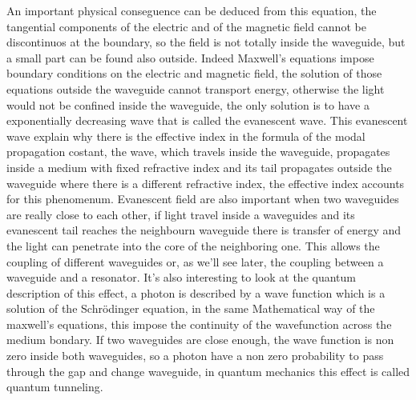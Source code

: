 An important physical conseguence can be deduced from this equation, the tangential components of the electric and of the magnetic field cannot be discontinuos at the boundary, so the field is not totally inside the waveguide, but a small part can be found also outside. Indeed Maxwell's equations impose boundary conditions on the electric and magnetic field, the solution of those equations outside the waveguide cannot transport energy, otherwise the light would not be confined inside the waveguide, the only solution is to have a exponentially decreasing wave that is called the evanescent wave. This evanescent wave explain why there is the effective index in the formula of the modal propagation costant, the wave, which travels inside the waveguide, propagates inside a medium with fixed refractive index and its tail propagates outside the waveguide where there is a different refractive index, the effective index accounts for this phenomenum.
Evanescent field are also important when two waveguides are really close to each other, if light travel inside a waveguides and its evanescent tail reaches the neighbourn waveguide there is transfer of energy and the light can penetrate into the core of the neighboring one. This allows the coupling of different waveguides or, as we'll see later, the coupling between a waveguide and a resonator. It's also interesting to look at the quantum description of this effect, a photon is described by a wave function which is a solution of the Schr{\"o}dinger equation, in the same Mathematical way of the maxwell's equations, this impose the continuity of the wavefunction across the medium bondary. If two waveguides are close enough, the wave function is non zero inside both waveguides, so a photon have a non zero probability to pass through the gap and change waveguide, in quantum mechanics this effect is called quantum tunneling. 
